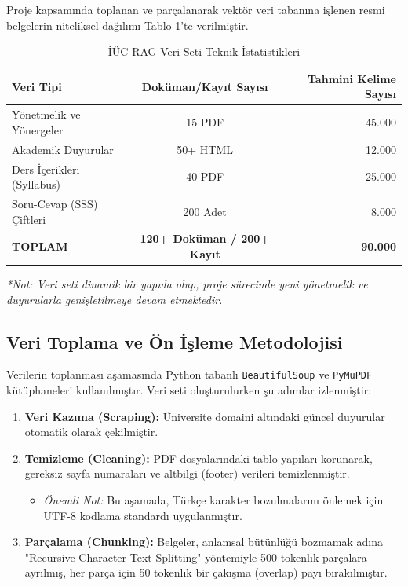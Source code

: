 \documentclass[12pt,a4paper]{report}
\begin{document}
Proje kapsamında toplanan ve parçalanarak vektör veri tabanına işlenen resmi belgelerin niteliksel dağılımı Tablo \ref{tab:dataset_stats}'te verilmiştir.

\begin{table}[h!]
\centering
\caption{İÜC RAG Veri Seti Teknik İstatistikleri}
\label{tab:dataset_stats}
\begin{tabular}{|l|c|r|}
\hline
\textbf{Veri Tipi} & \textbf{Doküman/Kayıt Sayısı} & \textbf{Tahmini Kelime Sayısı} \\ \hline
Yönetmelik ve Yönergeler & 15 PDF & ~45.000 \\ \hline
Akademik Duyurular & 50+ HTML & ~12.000 \\ \hline
Ders İçerikleri (Syllabus) & 40 PDF & ~25.000 \\ \hline
Soru-Cevap (SSS) Çiftleri & 200 Adet & ~8.000 \\ \hline
\textbf{TOPLAM} & \textbf{120+ Doküman / 200+ Kayıt} & \textbf{~90.000} \\ \hline
\end{tabular}
\footnotesize{\textit{*Not: Veri seti dinamik bir yapıda olup, proje sürecinde yeni yönetmelik ve duyurularla genişletilmeye devam etmektedir.}}
\end{table}

\subsection{Veri Toplama ve Ön İşleme Metodolojisi}
Verilerin toplanması aşamasında Python tabanlı \texttt{BeautifulSoup} ve \texttt{PyMuPDF} kütüphaneleri kullanılmıştır. Veri seti oluşturulurken şu adımlar izlenmiştir:
\begin{enumerate}
    \item \textbf{Veri Kazıma (Scraping):} Üniversite domaini altındaki güncel duyurular otomatik olarak çekilmiştir.
    \item \textbf{Temizleme (Cleaning):} PDF dosyalarındaki tablo yapıları korunarak, gereksiz sayfa numaraları ve altbilgi (footer) verileri temizlenmiştir.
    \begin{itemize}
        \item \textit{Önemli Not:} Bu aşamada, Türkçe karakter bozulmalarını önlemek için UTF-8 kodlama standardı uygulanmıştır.
    \end{itemize}
    \item \textbf{Parçalama (Chunking):} Belgeler, anlamsal bütünlüğü bozmamak adına "Recursive Character Text Splitting" yöntemiyle 500 tokenlık parçalara ayrılmış, her parça için 50 tokenlık bir çakışma (overlap) payı bırakılmıştır.
\end{enumerate}
\end{document}
